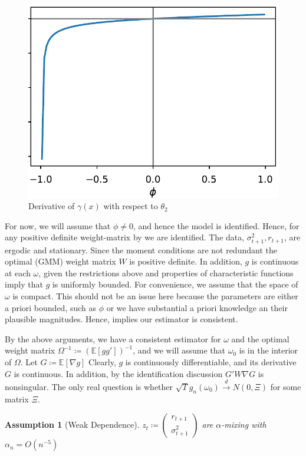 \documentclass[11pt]{article}
\newtheorem{Assumption}{Assumption}[section]
\newcommand*{\E}{\mathbb{E}}
\newcommand*{\N}{N}
\newcommand*{\dto}{\stackrel{d}{\to}}
\begin{document}
\begin{figure}[htb]
    \centering
    \caption{Derivative of $\gamma(x)$ with respect to $\theta_2$}
    \label{fig:fig:gamma_diff_theta2}
    \includegraphics[width=.5\textwidth]{gamma_diff_theta2.pdf}
\end{figure}


For now, we will assume that $\phi \neq 0$, and hence the model is identified.
Hence, for any positive definite weight-matrix by \textcite[Lemma 2.3]{newey1994large} we are identified.
The data, $\sigma^2_{t+1}, r_{t+1}$, are ergodic and stationary.
Since the moment conditions are not redundant the optimal (GMM) weight matrix $W$ is positive definite. 
In addition, $g$ is continuous at each $\omega$, given the restrictions above and properties of characteristic
functions imply that $g$ is uniformly bounded. 
For convenience, we assume that the space of $\omega$ is compact.
This should not be an issue here because the parameters  are either a priori bounded, such as $\phi$ or we have
substantial a priori knowledge an their plausible magnitudes.
Hence, \textcite[Theroem 2.6]{newey1994large} implies our estimator is consistent.

By the above arguments, we have a consistent estimator for $\omega$ and the optimal weight matrix $\Omega^{-1}
\coloneqq (\E\left[g g'\right])^{-1}$, and we will assume that $\omega_0$ is in the interior of $\Omega$.
Let $G \coloneqq \E\left[\nabla g\right]$
Clearly, $g$ is continuously differentiable, and its derivative $G$ is continuous.
In addition, by the identification discussion $G' W \nabla G$ is nonsingular.
The only real question is whether $\sqrt{T} g_n(\omega_0) \dto \N(0, \Xi)$ for some matrix $\Xi$.

\begin{Assumption}[Weak Dependence]
    \label{assumption:weak_dependence}
    $z_t \coloneqq \begin{pmatrix} r_{t+1} \\ \sigma^2_{t+1} \end{pmatrix}$ are $\alpha$-mixing with $\alpha_n =
       O\left(n^{-5}\right)$
\end{Assumption}
\end{document}

